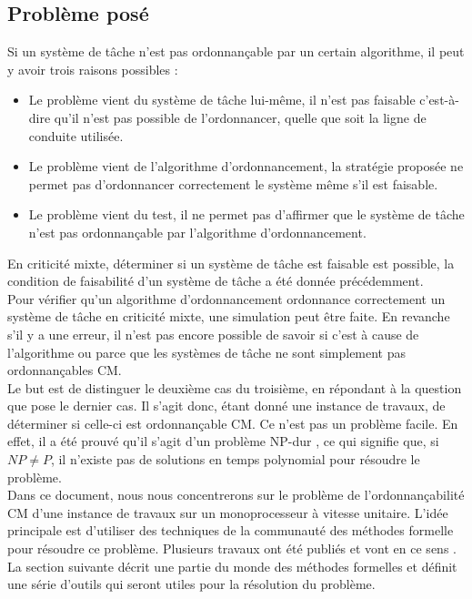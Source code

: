 \documentclass[12pt,a4paper,oneside]{book}
\theoremstyle{break}
\theoremstyle{breakplain}
\begin{document}
\subsection{Problème posé}
Si un système de tâche n'est pas ordonnançable par un certain algorithme, il peut y avoir trois raisons possibles \cite{bakerbrute} :
\begin{itemize}
\item Le problème vient du système de tâche lui-même, il n'est pas faisable c'est-à-dire qu'il n'est pas possible de l'ordonnancer, quelle que soit la ligne de conduite utilisée.
\item Le problème vient de l'algorithme d'ordonnancement, la stratégie proposée ne permet pas d'ordonnancer correctement le système même s'il est faisable.
\item Le problème vient du test, il ne permet pas d'affirmer que le système de tâche n'est pas ordonnançable par l'algorithme d'ordonnancement.
\end{itemize}

En criticité mixte, déterminer si un système de tâche est faisable est possible, la condition de faisabilité d'un système de tâche a été donnée précédemment.\\

Pour vérifier qu'un algorithme d'ordonnancement ordonnance  correctement un système de tâche en criticité mixte, une simulation peut être faite. En revanche s'il y a une erreur, il n'est pas encore possible de savoir si c'est à cause de l'algorithme ou parce que les systèmes de tâche ne sont simplement pas ordonnançables CM.\\

Le but est de distinguer le deuxième cas du troisième, en répondant à la question que pose le dernier cas. Il s'agit donc, étant donné une instance de travaux, de déterminer si celle-ci est ordonnançable CM. Ce n'est pas un problème facile. En effet, il a été prouvé qu'il s'agit d'un problème NP-dur \cite{baruah2009mixed}, ce qui signifie que, si $NP \neq P$, il n'existe pas de solutions en temps polynomial pour résoudre le problème.\\

Dans ce document, nous nous concentrerons sur le problème de l'ordonnançabilité CM d'une instance de travaux sur un monoprocesseur à vitesse unitaire. L'idée principale est d'utiliser des techniques de la communauté des méthodes formelle pour résoudre ce problème. Plusieurs travaux ont été publiés et vont en ce sens \cite{geeraerts2013multiprocessor} \cite{bakerbrute}.\\
La section suivante décrit une partie du monde des méthodes formelles et définit une série d'outils qui seront utiles pour la résolution du problème.
\end{document}
